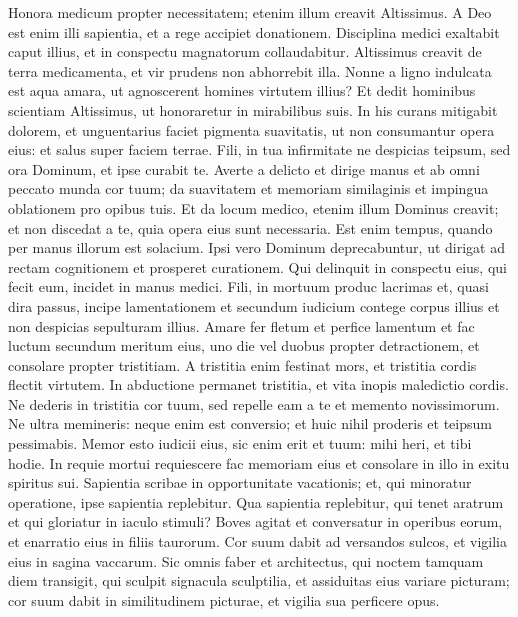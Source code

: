 \begin{biblechapter}  
\verse Honora medicum propter necessitatem; etenim illum creavit Altissimus. 
\verse A Deo est enim illi sapientia, et a rege accipiet donationem. 
\verse Disciplina medici exaltabit caput illius, et in conspectu magnatorum collaudabitur. 
\verse Altissimus creavit de terra medicamenta, et vir prudens non abhorrebit illa. 
\verse Nonne a ligno indulcata est aqua amara, 
\verse ut agnoscerent homines virtutem illius? Et dedit hominibus scientiam Altissimus, ut honoraretur in mirabilibus suis. 
\verse In his curans mitigabit dolorem, et unguentarius faciet pigmenta suavitatis, ut non consumantur opera eius: 
\verse et salus super faciem terrae. 
\verse Fili, in tua infirmitate ne despicias teipsum, sed ora Dominum, et ipse curabit te. 
\verse Averte a delicto et dirige manus et ab omni peccato munda cor tuum; 
\verse da suavitatem et memoriam similaginis et impingua oblationem pro opibus tuis. Et da locum medico, 
\verse etenim illum Dominus creavit; et non discedat a te, quia opera eius sunt necessaria. 
\verse Est enim tempus, quando per manus illorum est solacium. 
\verse Ipsi vero Dominum deprecabuntur, ut dirigat ad rectam cognitionem et prosperet curationem. 
\verse Qui delinquit in conspectu eius, qui fecit eum, incidet in manus medici. 
\verse Fili, in mortuum produc lacrimas et, quasi dira passus, incipe lamentationem et secundum iudicium contege corpus illius et non despicias sepulturam illius. 
\verse Amare fer fletum et perfice lamentum 
\verse et fac luctum secundum meritum eius, uno die vel duobus propter detractionem, et consolare propter tristitiam. 
\verse A tristitia enim festinat mors, et tristitia cordis flectit virtutem. 
\verse In abductione permanet tristitia, et vita inopis maledictio cordis. 
\verse Ne dederis in tristitia cor tuum, sed repelle eam a te et memento novissimorum. 
\verse Ne ultra memineris: neque enim est conversio; et huic nihil proderis et teipsum pessimabis. 
\verse Memor esto iudicii eius, sic enim erit et tuum: mihi heri, et tibi hodie. 
\verse In requie mortui requiescere fac memoriam eius et consolare in illo in exitu spiritus sui. 
\verse Sapientia scribae in opportunitate vacationis; et, qui minoratur operatione, ipse sapientia replebitur. Qua sapientia replebitur, 
\verse qui tenet aratrum et qui gloriatur in iaculo stimuli? Boves agitat et conversatur in operibus eorum, et enarratio eius in filiis taurorum. 
\verse Cor suum dabit ad versandos sulcos, et vigilia eius in sagina vaccarum. 
\verse Sic omnis faber et architectus, qui noctem tamquam diem transigit, qui sculpit signacula sculptilia, et assiduitas eius variare picturam; cor suum dabit in similitudinem picturae, et vigilia sua perficere opus. 

\end{biblechapter}
